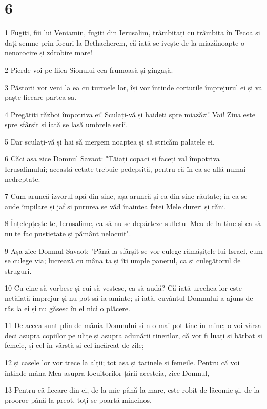 \chapter{6}

\par 1 Fugiți, fiii lui Veniamin, fugiți din Ierusalim, trâmbițați cu trâmbița în Tecoa și dați semne prin focuri la Bethacherem, că iată se ivește de la miazănoapte o nenorocire și zdrobire mare!
\par 2 Pierde-voi pe fiica Sionului cea frumoasă și gingașă.
\par 3 Păstorii vor veni la ea cu turmele lor, își vor întinde corturile împrejurul ei și va paște fiecare partea sa.
\par 4 Pregătiți război împotriva ei! Sculați-vă și haideți spre miazăzi! Vai! Ziua este spre sfârșit și iată se lasă umbrele serii.
\par 5 Dar sculați-vă și hai să mergem noaptea și să stricăm palatele ei.
\par 6 Căci așa zice Domnul Savaot: "Tăiați copaci și faceți val împotriva Ierusalimului; această cetate trebuie pedepsită, pentru că în ea se află numai nedreptate.
\par 7 Cum aruncă izvorul apă din sine, așa aruncă și ea din sine răutate; în ea se aude împilare și jaf și pururea se văd înaintea feței Mele dureri și răni.
\par 8 Înțelepțește-te, Ierusalime, ca să nu se depărteze sufletul Meu de la tine și ca să nu te fac pustietate și pământ nelocuit".
\par 9 Așa zice Domnul Savaot: "Până la sfârșit se vor culege rămășițele lui Israel, cum se culege via; lucrează cu mâna ta și îți umple panerul, ca și culegătorul de struguri.
\par 10 Cu cine să vorbesc și cui să vestesc, ca să audă? Că iată urechea lor este netăiată împrejur și nu pot să ia aminte; și iată, cuvântul Domnului a ajuns de râs la ei și nu găsesc în el nici o plăcere.
\par 11 De aceea sunt plin de mânia Domnului și n-o mai pot ține în mine; o voi vărsa deci asupra copiilor pe ulițe și asupra adunării tinerilor, că vor fi luați și bărbat și femeie, și cel în vârstă și cel încărcat de zile;
\par 12 și casele lor vor trece la alții; tot așa și țarinele și femeile. Pentru că voi întinde mâna Mea asupra locuitorilor țării acesteia, zice Domnul,
\par 13 Pentru că fiecare din ei, de la mic până la mare, este robit de lăcomie și, de la prooroc până la preot, toți se poartă mincinos.
